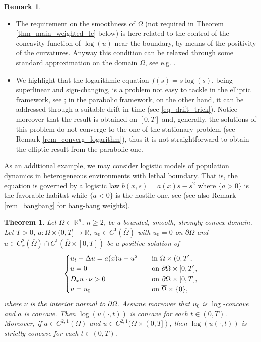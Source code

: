 \documentclass[11pt, reqno]{amsart}
\newtheorem{theorem}[lemma]{Theorem}
\theoremstyle{definition}
\newtheorem{remark}[lemma]{Remark}
\numberwithin{equation}{section}
\newcommand{\Omegabar}{\overline{\Omega}}
\newcommand{\R}{\mathbb{R}}
\begin{document}
\begin{remark}
\begin{itemize}
\item The requirement on the smoothness of $\Omega$ (not required in Theorem \ref{thm_main_weighted_le} below) is here related to the control of the concavity function of $\log(u)$ near the boundary, by means of the positivity of the curvatures. 
Anyway this condition can be relaxed through some standard approximation on the domain $\Omega$, see e.g. \cite{BMSplaplacian, GaSq24}.

\item We highlight that the logarithmic equation $f(s)=s \log(s)$, being superlinear and sign-changing, is a problem not easy to tackle in the elliptic framework, see \cite{Gallo-Mosconi-Squassina}; in the parabolic framework, on the other hand, it can be addressed through a suitable drift %
in time (see \eqref{eq_drift_trick}). 
Notice moreover that the result is obtained on $[0,T]$ and, generally, the solutions of this problem do not converge to the one of the stationary problem (see Remark \ref{rem_converg_logarithm}), thus it is not straightforward to obtain the elliptic result from the parabolic one. 
\end{itemize}
\end{remark}

As an additional example, we may consider logistic models of population dynamics in heterogeneous environments with lethal boundary. 
That is, the equation is governed by a logistic law $b(x,s) = a(x) s - s^2$ where $\{a>0\}$ is the favorable habitat while $\{a<0\}$ is the hostile one, see \cite{CaCo89, BeCo95, OSS02} (see also Remark \ref{rem_bangbang} for bang-bang weights). 
\begin{theorem}
\label{thm_populat}
	Let $\Omega \subset \R^n$, $n\geq 2$, be a bounded, smooth, strongly convex domain. 
Let $T>0$, $a\colon\Omega\times(0,T]\to \R$, $u_0\in C^1(\Omegabar)$ with $u_0=0$ on $\partial\Omega$ and $u \in C^2_x(\Omegabar) \cap C^1(\Omegabar\times[0,T])$ be a positive solution of
\begin{equation*}
\begin{cases}
u_t - \Delta u = a(x) u - u^2 &\quad \hbox{in $\Omega \times (0,T]$}, \\
u=0 & \quad\text{on }\partial \Omega\times [0,T],	 \\
D_x u \cdot \nu >0 & \quad\text{on }\partial \Omega\times [0,T], \\
u =u_0 & \quad \text{on } \Omegabar \times \{0\},
\end{cases}
\end{equation*}
where $\nu$ is the interior normal to $\partial \Omega$. 
Assume moreover that $u_0$ is $\log$-concave and $a$ is concave.
Then $\log(u(\cdot, t))$ is concave for each $t \in (0,T)$. Moreover, if $a\in C^{2,1}(\Omega)$ and $u \in C^{2,1}(\Omega \times (0,T])$, then $\log(u(\cdot, t))$ is strictly concave for each $t \in (0,T)$.
\end{theorem}
\end{document}
